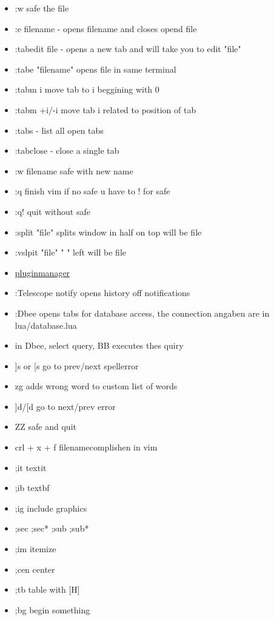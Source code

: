 \documentclass[12pt]{article}
\begin{document}
\begin{itemize}
    \item :w  safe the file
    \item :e filename - opens filename and closes opend file
    \item :tabedit file - opens a new tab and will take you to edit "file"
    \item :tabe "filename" opens file in same terminal 
    \item :tabm i move tab to i beggining with 0
    \item :tabm +i/-i move tab i related to position of tab
    \item :tabs - list all open tabs
    \item :tabclose - close a single tab
    \item :w filename safe with new name
    \item :q finish vim if no safe u have to ! for safe
    \item :q! quit without safe
    \item :split "file" splits window in half on top will be file
    \item :vslpit "file" "                      " left will be file
    \item \href{https://github.com/junegunn/vim-plug}{pluginmanager}
    \item :Telescope notify opens history off notifications
    \item :Dbee opens tabs for database access, the connection angaben are in lua/database.lua
    \item in Dbee, select query, BB executes thes quiry
    \item ]s or [s go to prev/next spellerror
    \item zg adds wrong word to custom list of words
    \item ]d/[d go to next/prev error

\end{itemize}
\begin{itemize}
    \item ZZ safe and quit
    \item crl + x + f filenamecomplishen in vim
    \item ;it textit{}
    \item ;ib textbf{}
    \item ;ig include graphics
    \item ;sec ;sec* ;sub ;sub*
    \item ;im itemize
    \item ;cen center
    \item ;tb table with [H]
    \item ;bg begin something
\end{itemize}
\end{document}
